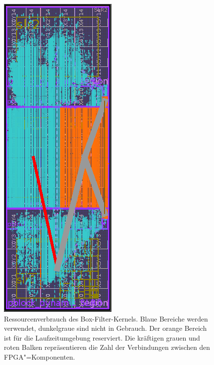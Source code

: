 \begin{figure}
    \centering
    \includegraphics{box_resources.png}
    \caption[Ressourcenverbrauch des Box-Filter-Kernels]{Ressourcenverbrauch des
             Box-Filter-Kernels. Blaue Bereiche werden verwendet, dunkelgraue
             sind nicht in Gebrauch. Der orange Bereich ist für die
             Laufzeitumgebung reserviert. Die kräftigen grauen und roten Balken
             repräsentieren die Zahl der Verbindungen zwischen den
             FPGA"=Komponenten.}
\end{figure}
